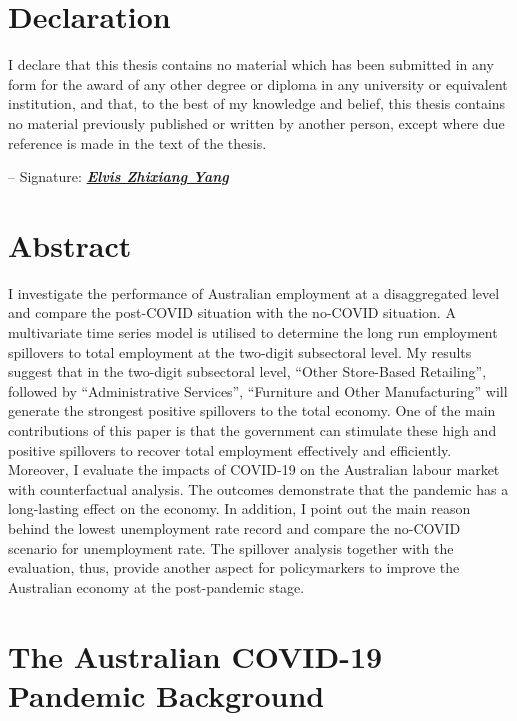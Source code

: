 \documentclass{monashthesis}
\begin{document}
\hypertarget{declaration}{%
\chapter*{Declaration}\label{declaration}}

I declare that this thesis contains no material which has been submitted in any form for the award of any other degree or diploma in any university or equivalent institution, and that, to the best of my knowledge and belief, this thesis contains no material previously published or written by another person, except where due reference is made in the text of the thesis.

\vspace{12pt}

-- Signature: \underline{\emph{\textbf{Elvis Zhixiang Yang}}}

\hypertarget{abstract}{%
\chapter*{Abstract}\label{abstract}}

I investigate the performance of Australian employment at a disaggregated level and compare the post-COVID situation with the no-COVID situation. A multivariate time series model is utilised to determine the long run employment spillovers to total employment at the two-digit subsectoral level. My results suggest that in the two-digit subsectoral level, ``Other Store-Based Retailing'', followed by ``Administrative Services'', ``Furniture and Other Manufacturing'' will generate the strongest positive spillovers to the total economy. One of the main contributions of this paper is that the government can stimulate these high and positive spillovers to recover total employment effectively and efficiently. Moreover, I evaluate the impacts of COVID-19 on the Australian labour market with counterfactual analysis. The outcomes demonstrate that the pandemic has a long-lasting effect on the economy. In addition, I point out the main reason behind the lowest unemployment rate record and compare the no-COVID scenario for unemployment rate. The spillover analysis together with the evaluation, thus, provide another aspect for policymarkers to improve the Australian economy at the post-pandemic stage.

\hypertarget{the-australian-covid-19-pandemic-background}{%
\chapter{The Australian COVID-19 Pandemic Background}\label{the-australian-covid-19-pandemic-background}}
\end{document}
